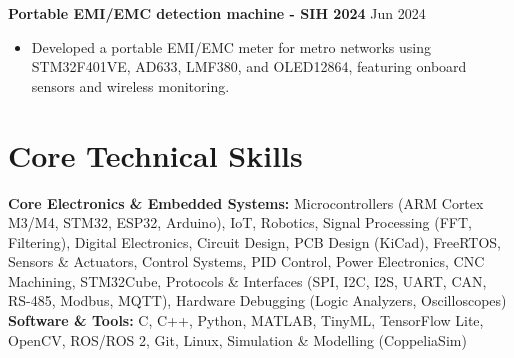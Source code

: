 \documentclass[10pt,a4paper]{article}%
\begin{document}
\noindent \textbf{Portable EMI/EMC detection machine - SIH 2024} \hfill Jun 2024%
\begin{itemize}[leftmargin=15pt, nosep, topsep=0pt]%
\item Developed a portable EMI/EMC meter for metro networks using STM32F401VE, AD633, LMF380, and OLED12864, featuring onboard sensors and wireless monitoring.%
\end{itemize} \vspace{8pt}

\section*{Core Technical Skills}%
\noindent \textbf{Core Electronics \& Embedded Systems:} Microcontrollers (ARM Cortex M3/M4, STM32, ESP32, Arduino), IoT, Robotics, Signal Processing (FFT, Filtering), Digital Electronics, Circuit Design, PCB Design (KiCad), FreeRTOS, Sensors \& Actuators, Control Systems, PID Control, Power Electronics, CNC Machining, STM32Cube, Protocols \& Interfaces (SPI, I2C, I2S, UART, CAN, RS-485, Modbus, MQTT), Hardware Debugging (Logic Analyzers, Oscilloscopes) \vspace{6pt}\\%
\noindent \textbf{Software \& Tools:} C, C++, Python, MATLAB, TinyML, TensorFlow Lite, OpenCV, ROS/ROS 2, Git, Linux, Simulation \& Modelling (CoppeliaSim)%
\end{document}
